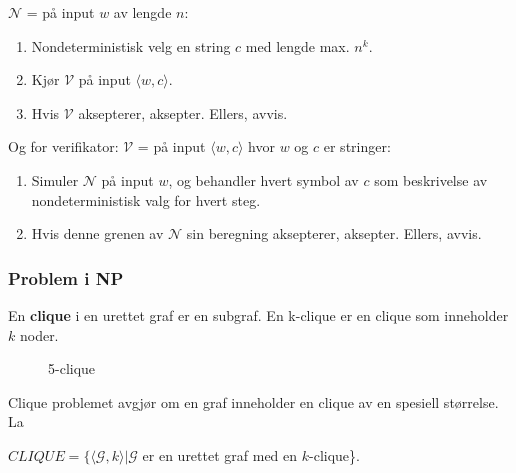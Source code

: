\documentclass[11pt,a4paper]{article}
\begin{document}
$\mathcal{N}$ = på input $w$ av lengde $n$:
\begin{enumerate}
\item{Nondeterministisk velg en string $c$ med lengde max. $n^k$.}
\item{Kjør $\mathcal{V}$ på input $\langle w,c \rangle$}.
\item{Hvis $\mathcal{V}$ aksepterer, aksepter. Ellers, avvis.}
\end{enumerate}

Og for verifikator:
$\mathcal{V}$ = på input $\langle w,c \rangle$ hvor $w$ og $c$ er stringer:
\begin{enumerate}
\item{Simuler $\mathcal{N}$ på input $w$, og behandler hvert symbol av $c$ som beskrivelse av nondeterministisk valg for hvert steg.}
\item{Hvis denne grenen av $\mathcal{N}$ sin beregning aksepterer, aksepter. Ellers, avvis.}
\end{enumerate}

\subsubsection{Problem i NP}
En \textbf{clique} i en urettet graf er en subgraf. En k-clique er en clique som inneholder $k$ noder.

 \begin{figure}[h!]
 \centering
 \scalebox{0.6}
 {
 }
 \caption{5-clique}
 \end{figure}

Clique problemet avgjør om en graf inneholder en clique av en spesiell størrelse. La
\begin{center}
$CLIQUE = \{\langle \mathcal{G},k \rangle | \mathcal{G}$ er en urettet graf med en $k$-clique\}.
\end{center}
\end{document}
